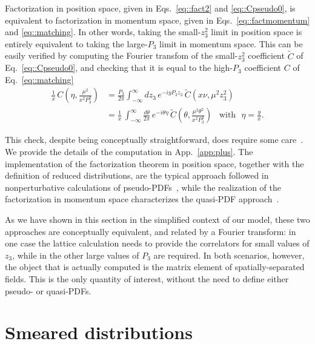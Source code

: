 Factorization in position space, given in Eqs.~\eqref{eq::fact2} and
\eqref{eq::Cpseudo0}, is equivalent to factorization in momentum space, given in
Eqs.~\eqref{eq::factmomentum} and \eqref{eq::matching}. In other words, taking
the small-$z_3^2$ limit in position space is entirely equivalent to taking the
large-$P_3$ limit in momentum space. This can be easily verified by computing
the Fourier transfom of the small-$z_3^2$ coefficient $\tilde{C}$ of
Eq.~\eqref{eq::Cpseudo0}, and checking that it is equal to the high-$P_3$
coefficient $C$ of Eq.~\eqref{eq::matching} 
\begin{align}
	\label{eq::check}
	\frac{1}{x}\,C\left(\eta,\frac{\mu^2}{x^2 P_3^2}\right) &= 
	\frac{P_3}{2\pi}\int_{-\infty}^{\infty} dz_3\, e^{-i y P_3 z_3 }\,
	\tilde{C}\left(x\nu, \mu^2 z_3^2 \right) \nonumber \\
	&= \frac{1}{x}\,\int_{-\infty}^{\infty}\frac{d\theta}{2\pi}\, e^{-i\theta\eta}\,
	\tilde{C}\left(\theta, \frac{\mu^2\theta^2}{x^2 P_3^2} \right)\,\,\,\,\, \text{with}\,\,\,\, \eta = \frac{y}{x}.
\end{align}

This check, despite being conceptually straightforward, does require some
care~\cite{Izubuchi:2018srq}. We provide the details of the computation in
App.~\ref{app:plus}.
%
The implementation of the factorization theorem in position space, together with
the definition of reduced distributions, are the typical approach followed in nonperturbative calculations of
pseudo-PDFs~\cite{Radyushkin:2017cyf,Orginos:2017kos,Joo:2019jct,Joo:2019bzr,Joo:2020spy,
Radyushkin:2019owq}, while the realization of the factorization in momentum
space characterizes the quasi-PDF
approach~\cite{PhysRevLett.110.262002,Alexandrou:2018pbm, Alexandrou:2019lfo,
Chai:2020nxw, Bhat:2020ktg}. 

As we have shown in this section in the simplified context of our model, these
two approaches are conceptually equivalent, and related by a Fourier transform:
in one case the lattice calculation needs to provide the correlators for  small
values of $z_3$, while in the other large values of $P_3$ are required. In both
scenarios, however, the object that is actually computed is the matrix element
of spatially-separated fields. This is the only quantity of interest, without
the need to define either pseudo- or quasi-PDFs.

\section{Smeared distributions}
\label{sec:flow}

